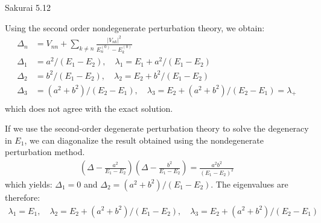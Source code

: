\documentclass{article}
\begin{document}
\begin{section}{Sakurai 5.12}
\begin{tcolorbox}[breakable]
			Using the second order nondegenerate perturbation theory, we obtain:
			\begin{align*}
				\Delta_n &= V_{nn} + \sum_{k \neq n} \frac{|V_{nk}|^2}{E_n^{(0)} - E_k^{(0)}} \\
				\Delta_1 &= a^2/(E_1 - E_2), \quad \lambda_1 = E_1 + a^2/(E_1 - E_2) \\
				\Delta_2 &= b^2/(E_1 - E_2), \quad \lambda_2 = E_2 + b^2/(E_1 - E_2) \\
				\Delta_3 &= (a^2+b^2)/(E_2 - E_1), \quad \lambda_3 = E_2 + (a^2 + b^2)/(E_2 - E_1) = \lambda_+\\
 			\end{align*}
			which does not agree with the exact solution.
			
			If we use the second-order degenerate perturbation theory to solve the degeneracy in $E_1$, we can diagonalize the result obtained using the nondegenerate perturbation method.
			\begin{align*}
				\left( \Delta - \frac{a^2}{E_1 - E_2} \right)\left( \Delta - \frac{b^2}{E_1 - E_2} \right) = \frac{a^2b^2}{(E_1 - E_2)^2}
			\end{align*}
			which yields: $\Delta_1 = 0$ and $\Delta_2 = (a^2 +b^2)/(E_1 - E_2)$. The eigenvalues are therefore:
			\begin{align*}
				\lambda_1 = E_1, \quad \lambda_2 = E_2 + (a^2 + b^2)/(E_1 - E_2), \quad \lambda_3 = E_2 + (a^2 + b^2)/(E_2 - E_1)
			\end{align*}
			
		\end{tcolorbox}
	\end{section}
\end{document}
